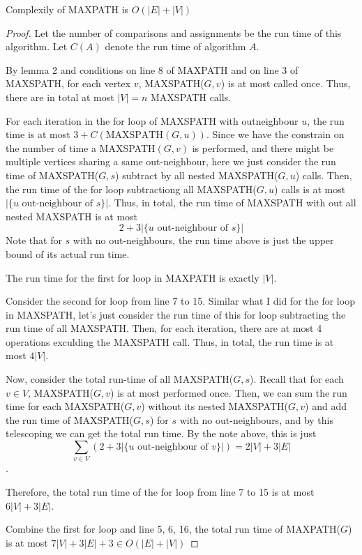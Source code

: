 \documentclass[10pt]{article}
\begin{document}
Complexily of MAXPATH is $O(|E|+|V|)$
\begin{proof}
	Let the number of comparisons and assignments be the run time of this
	algorithm. 
	Let $C(A)$ denote the run time of algorithm $A$.
	
	By lemma 2 and conditions on line 8 of MAXPATH and on line 3 of MAXSPATH,
	for each vertex $v$, MAXSPATH($G, v$) is at most called once.
	Thus, there are in total at most $|V| = n$ MAXSPATH calls. 

	For each iteration in the for loop of MAXSPATH with outneighbour $u$, the
	run time is at most $3 + C(\mbox{MAXSPATH}(G,u))$.
	Since we have the constrain on the number of time a MAXSPATH$(G,v)$ is
	performed, and there might be multiple vertices sharing a same
	out-neighbour, here we just consider the run time of MAXSPATH($G,s$)
	subtract by all nested MAXSPATH($G, u$) calls. 
	Then, the run time of the for loop subtractiong all MAXSPATH($G, u$) calls
	is at most $|\{u \text{ out-neighbour of } s\}|$.
	Thus, in total, the run time of MAXSPATH with out all nested MAXSPATH is at
	most 
	$$2 + 3|\{u \text{ out-neighbour of } s\}|$$
	Note that for $s$ with no out-neighbours, the run time above is just the
	upper bound of its actual run time. 

	The run time for the first for loop in MAXPATH is exactly $|V|$. 

	Consider the second for loop from line 7 to 15.
	Similar what I did for the for loop in MAXSPATH, let's just consider the
	run time of this for loop subtracting the run time of all MAXSPATH. 
	Then, for each iteration, there are at most 4 operations exculding the
	MAXSPATH call. 
	Thus, in total, the run time is at most $4|V|$. 
	
	Now, consider the total run-time of all MAXSPATH($G, s$). 
	Recall that for each $v \in V$, MAXSPATH($G, v$) is at most performed once. 
	Then, we can sum the run time for each MAXSPATH($G, v$) without its nested
	MAXSPATH($G, v$) and add the run time of MAXSPATH($G,s$) for $s$ with no
	out-neighbours, and by this telescoping we can get the total run time.
	By the note above, this is just 
	$$\sum_{v \in V}(2+3|\{u \text{ out-neighbour of } v\}|) = 2|V| + 3|E|$$. 

	Therefore, the total run time of the for loop from line 7 to 15 is at most
	$6|V| + 3|E|$.

	Combine the first for loop and line 5, 6, 16, the total run time of
	MAXPATH($G$) is at most $7|V|+3|E|+3 \in O(|E|+|V|)$
\end{proof}
\end{document}
